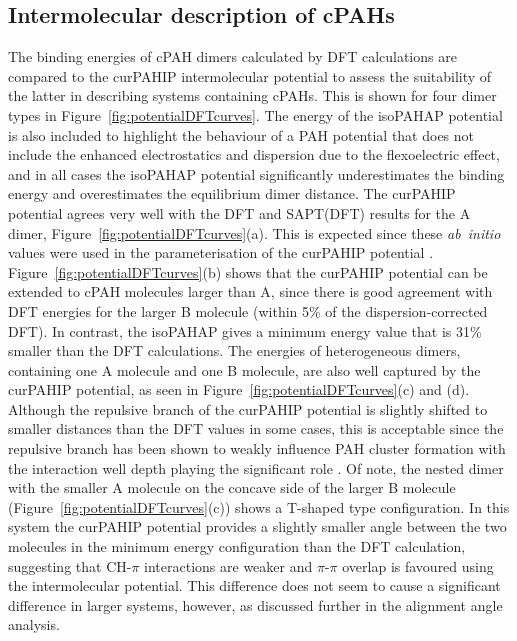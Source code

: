 \subsection{Intermolecular description of cPAHs} 
%
The binding energies of cPAH dimers calculated by DFT calculations are compared to the curPAHIP intermolecular potential to assess the suitability of the latter in describing systems containing cPAHs. This is shown for four dimer types in Figure~\ref{fig:potentialDFTcurves}. The energy of the isoPAHAP potential is also included to highlight the behaviour of a PAH potential that does not include the enhanced electrostatics and dispersion due to the flexoelectric effect, and in all cases the isoPAHAP potential significantly underestimates the binding energy and overestimates the equilibrium dimer distance.
The curPAHIP potential agrees very well with the DFT and SAPT(DFT) results for the A dimer, Figure~\ref{fig:potentialDFTcurves}(a). This is expected since these \textit{ab~initio} values were used in the parameterisation of the curPAHIP potential \cite{bowal2019ion}. 
Figure~\ref{fig:potentialDFTcurves}(b) shows that the curPAHIP potential can be extended to cPAH molecules larger than A, since there is good agreement with DFT energies for the larger B molecule (within 5\% of the dispersion-corrected DFT). In contrast, the isoPAHAP gives a minimum energy value that is 31\% smaller than the DFT calculations.
The energies of heterogeneous dimers, containing one A molecule and one B molecule, are also well captured by the curPAHIP potential, as seen in Figure~\ref{fig:potentialDFTcurves}(c) and (d). Although the repulsive branch of the curPAHIP potential is slightly shifted to smaller distances than the DFT values in some cases, this is acceptable since the repulsive branch has been shown to weakly influence PAH cluster formation with the interaction well depth playing the significant role \cite{Pascazio2017}. Of note, the nested dimer with the smaller A molecule on the concave side of the larger B molecule (Figure~\ref{fig:potentialDFTcurves}(c)) shows a T-shaped type configuration. In this system the curPAHIP potential provides a slightly smaller %
angle between the two molecules in the minimum energy configuration than the DFT calculation, suggesting that CH-$\pi$ interactions are weaker and $\pi$-$\pi$ overlap is favoured using the intermolecular potential.  This difference does not seem to cause a significant difference in larger systems, however, as discussed further in the alignment angle analysis. %
